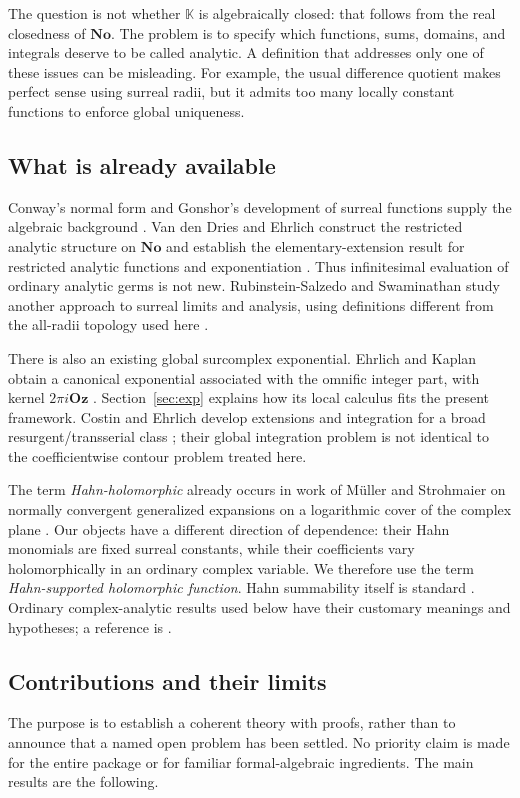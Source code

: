 \documentclass[11pt,oneside]{article}
\theoremstyle{definition}\newtheorem{definition}[theorem]{Definition}
\newcommand{\No}{\mathbf{No}}
\newcommand{\Oz}{\mathbf{Oz}}
\newcommand{\K}{\mathbb K}
\begin{document}
The question is not whether $\K$ is algebraically closed: that follows from the real closedness of $\No$. The problem is to specify which functions, sums, domains, and integrals deserve to be called analytic. A definition that addresses only one of these issues can be misleading. For example, the usual difference quotient makes perfect sense using surreal radii, but it admits too many locally constant functions to enforce global uniqueness.

\subsection{What is already available}
Conway's normal form and Gonshor's development of surreal functions supply the algebraic background \cite{Conway,Gonshor}. Van den Dries and Ehrlich construct the restricted analytic structure on $\No$ and establish the elementary-extension result for restricted analytic functions and exponentiation \cite{vdDE,vdDEerr}. Thus infinitesimal evaluation of ordinary analytic germs is not new. Rubinstein-Salzedo and Swaminathan study another approach to surreal limits and analysis, using definitions different from the all-radii topology used here \cite{RSS}.

There is also an existing global surcomplex exponential. Ehrlich and Kaplan obtain a canonical exponential associated with the omnific integer part, with kernel $2\pi i\Oz$ \cite[Section 11]{EK}. Section~\ref{sec:exp} explains how its local calculus fits the present framework. Costin and Ehrlich develop extensions and integration for a broad resurgent/transserial class \cite{CE}; their global integration problem is not identical to the coefficientwise contour problem treated here.

The term \emph{Hahn-holomorphic} already occurs in work of M\"uller and Strohmaier on normally convergent generalized expansions on a logarithmic cover of the complex plane \cite{MS}. Our objects have a different direction of dependence: their Hahn monomials are fixed surreal constants, while their coefficients vary holomorphically in an ordinary complex variable. We therefore use the term \emph{Hahn-supported holomorphic function}. Hahn summability itself is standard \cite{Alling,Marker}. Ordinary complex-analytic results used below have their customary meanings and hypotheses; a reference is \cite{Ahlfors}.

\subsection{Contributions and their limits}
The purpose is to establish a coherent theory with proofs, rather than to announce that a named open problem has been settled. No priority claim is made for the entire package or for familiar formal-algebraic ingredients. The main results are the following.
\end{document}
